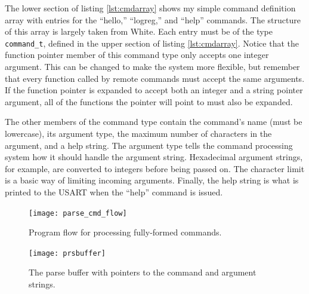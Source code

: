 The lower section of listing \ref{lst:cmdarray} shows my simple command definition array with entries for the ``hello,'' ``logreg,'' and ``help'' commands. The structure of this array is largely taken from White\cite{bok:white2012}.  Each entry must be of the type \texttt{command\_t}, defined in the upper section of listing \ref{lst:cmdarray}.  Notice that the function pointer member of this command type only accepts one integer argument.  This can be changed to make the system more flexible, but remember that every function called by remote commands must accept the same arguments.  If the function pointer is expanded to accept both an integer and a string pointer argument, all of the functions the pointer will point to must also be expanded.  

The other members of the command type contain the command's name (must be lowercase), its argument type, the maximum number of characters in the argument, and a help string.  The argument type tells the command processing system how it should handle the argument string.  Hexadecimal argument strings, for example, are converted to integers before being passed on.  The character limit is a basic way of limiting incoming arguments.  Finally, the help string is what is printed to the USART when the ``help'' command is issued.

\begin{figure}[ht]
    \begin{center}
        \texttt{[image: parse\_cmd\_flow]}
        \caption{Program flow for processing fully-formed commands.\label{fig:cmdflow}}
    \end{center}
\end{figure}

\begin{figure}[ht]
    \begin{center}
        \texttt{[image: prsbuffer]}
        \caption{The parse buffer with pointers to the command and argument strings.\label{fig:prsbuffer}}
    \end{center}
\end{figure}

